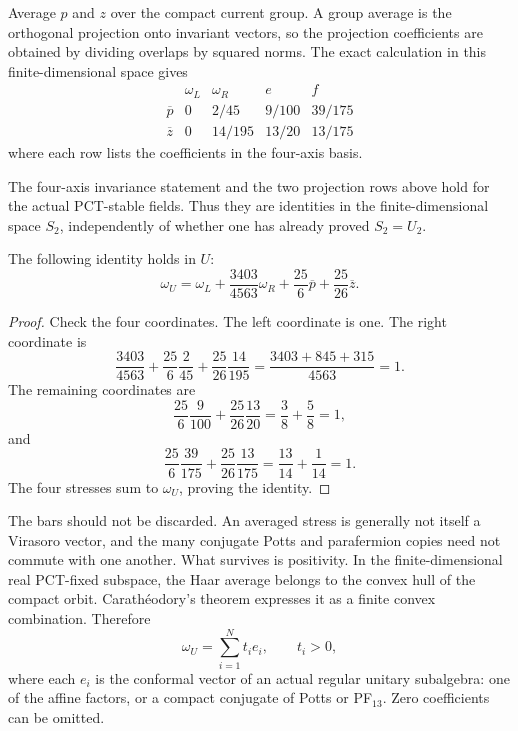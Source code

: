Average $p$ and $z$ over the compact current group. A group average
is the orthogonal projection onto invariant vectors, so the projection
coefficients are obtained by dividing overlaps by squared norms. The
exact calculation in this finite-dimensional space gives
\[
\begin{array}{c|cccc}
 &\omega_L&\omega_R&e&f\\\hline
 \overline p&0&2/45&9/100&39/175\\
 \overline z&0&14/195&13/20&13/175
\end{array}
\]
where each row lists the coefficients in the four-axis basis.

\begin{constructioninput}
The four-axis invariance statement and the two projection rows above
hold for the actual PCT-stable fields. Thus they are identities in the
finite-dimensional space $S_2$, independently of whether one has
already proved $S_2=U_2$.
\end{constructioninput}

\begin{proposition}
The following identity holds in $U$:
\begin{equation}\label{eq:c-positive-stress}
 \omega_U=\omega_L+\frac{3403}{4563}\omega_R
                    +\frac{25}{6}\overline p
                    +\frac{25}{26}\overline z.
\end{equation}
\end{proposition}
\begin{proof}
Check the four coordinates. The left coordinate is one. The right
coordinate is
\[
 \frac{3403}{4563}+\frac{25}{6}\frac2{45}
                  +\frac{25}{26}\frac{14}{195}
 =\frac{3403+845+315}{4563}=1.
\]
The remaining coordinates are
\[
 \frac{25}{6}\frac9{100}+\frac{25}{26}\frac{13}{20}
 =\frac38+\frac58=1,
\]
and
\[
 \frac{25}{6}\frac{39}{175}+\frac{25}{26}\frac{13}{175}
 =\frac{13}{14}+\frac1{14}=1.
\]
The four stresses sum to $\omega_U$, proving the identity.
\end{proof}

The bars should not be discarded. An averaged stress is generally not
itself a Virasoro vector, and the many conjugate Potts and parafermion
copies need not commute with one another. What survives is positivity.
In the finite-dimensional real PCT-fixed subspace, the Haar average
belongs to the convex hull of the compact orbit. Carath\'eodory's
theorem expresses it as a finite convex combination. Therefore
\begin{equation}\label{eq:c-finite-positive}
 \omega_U=\sum_{i=1}^N t_i e_i,\qquad t_i>0,
\end{equation}
where each $e_i$ is the conformal vector of an actual regular unitary
subalgebra: one of the affine factors, or a compact conjugate of Potts
or PF$_{13}$. Zero coefficients can be omitted.

